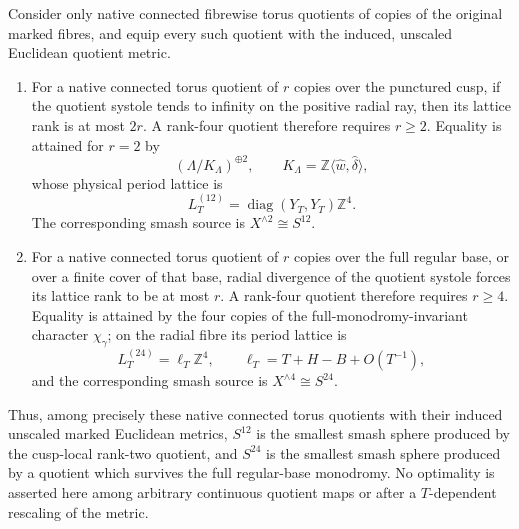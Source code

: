 \begin{theorem}
\label{cusp-cone-optimal-exponents}
Consider only native connected fibrewise torus quotients of copies of the
original marked fibres, and equip every such quotient with the induced,
unscaled Euclidean quotient metric.

\begin{enumerate}
\item For a native connected torus quotient of \(r\) copies over the
punctured cusp, if the quotient systole tends to infinity on the positive
radial ray, then its lattice rank is at most \(2r\).  A rank-four quotient
therefore requires \(r\geq2\).  Equality is attained for \(r=2\) by
\[
 (\Lambda/K_\Lambda)^{\oplus2},
 \qquad K_\Lambda=
 \mathbb Z\langle\widehat w,\widehat\delta\rangle,
\]
whose physical period lattice is
\[
 L_T^{(12)}=\operatorname{diag}(Y_T,Y_T)\mathbb Z^4.
\]
The corresponding smash source is
\(X^{\wedge2}\cong S^{12}\).

\item For a native connected torus quotient of \(r\) copies over the full
regular base, or over a finite cover of that base, radial divergence of the
quotient systole forces its lattice rank to be at most \(r\).  A rank-four
quotient therefore requires \(r\geq4\).  Equality is attained by the four
copies of the full-monodromy-invariant character \(\chi_\gamma\); on the
radial fibre its period lattice is
\[
 L_T^{(24)}=\ell_T\mathbb Z^4,
 \qquad
 \ell_T=T+H-B+O(T^{-1}),
\]
and the corresponding smash source is
\(X^{\wedge4}\cong S^{24}\).
\end{enumerate}

Thus, among precisely these native connected torus quotients with their
induced unscaled marked Euclidean metrics, \(S^{12}\) is the smallest smash
sphere produced by the cusp-local rank-two quotient, and \(S^{24}\) is the
smallest smash sphere produced by a quotient which survives the full
regular-base monodromy.  No optimality is asserted here among arbitrary
continuous quotient maps or after a \(T\)-dependent rescaling of the metric.
\end{theorem}


